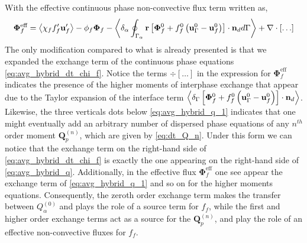 With the effective continuous phase non-convective flux term written as, 
\begin{align*}
    \mathbf{\Phi}_f^\text{eff}
    = \left<\chi_f f_f' \textbf{u}_f'\right>
    - \phi_f \bm\Phi_f
    - \left<\delta_\alpha \oint_{\Gamma_{\alpha}} \textbf{r}\left[
        \mathbf{\Phi}_f^0
        + f_f^0
        \left(
            \textbf{u}_\Gamma^0
            - \textbf{u}_f^0
        \right)
    \right]
    \cdot \textbf{n}_d d\Gamma\right>
    + \mathbf{\nabla}\cdot[\ldots]
\end{align*}
The only modification compared to what is already presented is that we expanded the exchange term of the continuous phase equations \eqref{eq:avg_hybrid_dt_chi_f}. 
Notice the terms $\div[\ldots]$ in the expression for  $\mathbf{\Phi}_f^\text{eff}$ indicates the presence of the higher moments of interphase exchange that appear due to the Taylor expansion of the interface term $\left<\delta_\Gamma \left[
    \mathbf{\Phi}_f^0
    + f_f^0
    \left(
        \textbf{u}_\Gamma ^0
        - \textbf{u}_f^0
    \right)
\right]
\cdot \textbf{n}_d\right>$. 
Likewise, the three verticals dots below \ref{eq:avg_hybrid_q_1} indicates that one might eventually add an arbitrary number of dispersed phase equations of any $n^{th}$ order moment $\textbf{Q}_p^{(n)}$, which are given by \ref{eq:dt_Q_n}. 
Under this form we can notice that the exchange term on the right-hand side of \ref{eq:avg_hybrid_dt_chi_f} is exactly the one appearing on the right-hand side of \ref{eq:avg_hybrid_q}. 
Additionally, in the effective flux $\mathbf{\Phi}_f^\text{eff}$ one see appear the exchange term of \ref{eq:avg_hybrid_q_1} and so on for the higher moments equations. 
Consequently, the zeroth order exchange term makes the transfer between $Q_\alpha^{(0)}$ and plays the role of a source term for $f_f$, while the first and higher order exchange terms act as a source for the $\textbf{Q}_p^{(n)}$, and play the role of an effective non-convective fluxes for $f_f$. 


